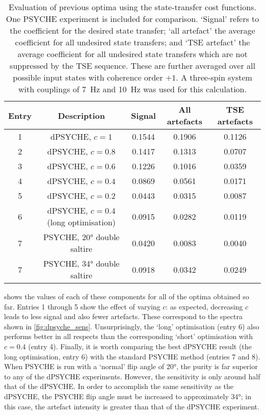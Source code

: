 \begin{table}[htb]
    \begin{tabular}{ccccc}
        \toprule
        \textbf{Entry} & \textbf{Description} & \textbf{Signal} & \textbf{All artefacts} & \textbf{TSE artefacts} \\
        \midrule
        1 & dPSYCHE, $c = 1$                       & 0.1544 & 0.1906 & 0.1126 \\
        2 & dPSYCHE, $c = 0.8$                     & 0.1417 & 0.1313 & 0.0707 \\
        3 & dPSYCHE, $c = 0.6$                     & 0.1226 & 0.1016 & 0.0359 \\
        4 & dPSYCHE, $c = 0.4$                     & 0.0869 & 0.0561 & 0.0171 \\
        5 & dPSYCHE, $c = 0.2$                     & 0.0443 & 0.0315 & 0.0087 \\
        6 & dPSYCHE, $c = 0.4$ (long optimisation) & 0.0915 & 0.0282 & 0.0119 \\
        7 & PSYCHE, \ang{20} double saltire        & 0.0420 & 0.0083 & 0.0040 \\
        7 & PSYCHE, \ang{34} double saltire        & 0.0918 & 0.0342 & 0.0249 \\
        \bottomrule
    \end{tabular}
    \caption[Evaluation of previous optima using state-transfer cost functions]{
        Evaluation of previous optima using the state-transfer cost functions.
        One PSYCHE experiment is included for comparison.
        `Signal' refers to the coefficient for the desired state transfer;
        `all artefact' the average coefficient for all undesired state transfers;
        and `TSE artefact' the average coefficient for all undesired state transfers which are not suppressed by the TSE sequence.
        These are further averaged over all possible input states with coherence order $+1$.
        A three-spin system with couplings of \qty{7}{\Hz} and \qty{10}{\Hz} was used for this calculation.
    }
    \label{tbl:specopt_to_states}
\end{table}

 shows the values of each of these components for all of the optima obtained so far.
Entries 1 through 5 show the effect of varying $c$: as expected, decreasing $c$ leads to less signal and also fewer artefacts.
These correspond to the spectra shown in \cref{fig:dpsyche_sens}.
Unsurprisingly, the `long' optimisation (entry 6) also performs better in all respects than the corresponding `short' optimisation with $c = 0.4$ (entry 4).
Finally, it is worth comparing the best dPSYCHE result (the long optimisation, entry 6) with the standard PSYCHE method (entries 7 and 8).
When PSYCHE is run with a `normal' flip angle of \ang{20}, the purity is far superior to any of the dPSYCHE experiments.
However, the sensitivity is only around half that of the dPSYCHE.
In order to accomplish the same sensitivity as the dPSYCHE, the PSYCHE flip angle must be increased to approximately \ang{34}; in this case, the artefact intensity is greater than that of the dPSYCHE experiment.

